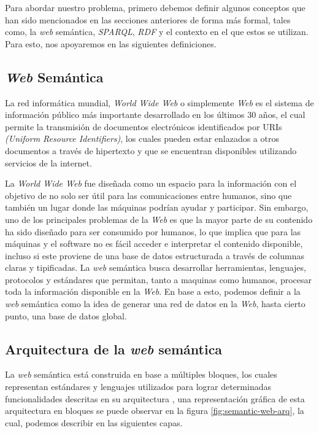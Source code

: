 
Para abordar nuestro problema, primero debemos definir algunos conceptos que han
sido mencionados en las secciones anteriores de forma más formal, tales como, la
\textit{web} semántica, \textit{SPARQL}, \textit{RDF} y el contexto en el que
estos se utilizan. Para esto, nos apoyaremos en las siguientes definiciones.

\subsection{\textit{Web} Semántica}

La red informática mundial, \textit{World Wide Web} o simplemente \textit{Web}
es el sistema de información público más importante desarrollado en los últimos
30 años, el cual permite la transmisión de documentos electrónicos identificados
por URIs \textit{(Uniform Resource Identifiers)}, los cuales pueden estar
enlazados a otros documentos a través de hipertexto y que se encuentran
disponibles utilizando servicios de la internet.

La \textit{World Wide Web} fue diseñada como un espacio para la información con
el objetivo de no solo ser útil para las comunicaciones entre humanos, sino que
también un lugar donde las máquinas podrían ayudar y participar. Sin embargo,
uno de los principales problemas de la \textit{Web} es que la mayor parte de su
contenido ha sido diseñado para ser consumido por humanos, lo que implica que
para las máquinas y el software no es fácil acceder e interpretar el contenido
disponible, incluso si este proviene de una base de datos estructurada a través
de columnas claras y tipificadas. La \textit{web} semántica busca desarrollar
herramientas, lenguajes, protocolos y estándares que permitan, tanto a maquinas
como humanos, procesar toda la información disponible en la \textit{Web}. En
base a esto, podemos definir a la \textit{web} semántica como la idea de generar
una red de datos en la \textit{Web}, hasta cierto punto, una base de datos
global.
\cite{berners1998semantic}

\subsection{Arquitectura de la \textit{web} semántica}

La \textit{web} semántica está construida en base a múltiples bloques, los
cuales representan estándares y lenguajes utilizados para lograr determinadas
funcionalidades descritas en su arquitectura \cite{harth2011semantic}, una
representación gráfica de esta arquitectura en bloques se puede observar en la
figura \ref{fig:semantic-web-arq}, la cual, podemos describir en las siguientes
capas.


